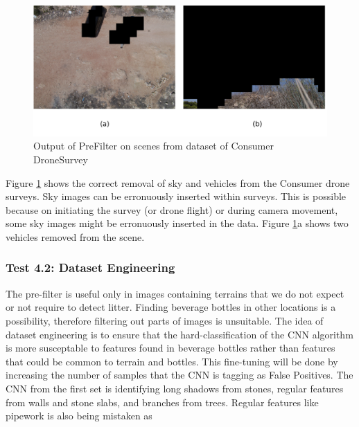 \documentclass{IEEEtran}
\begin{document}
\begin{figure}[H]
\centering
\includegraphics[scale=0.5]{images/filter-test.png}
\caption{Output of PreFilter on scenes from dataset of Consumer DroneSurvey}
\label{fig:prefiltertest}
\end{figure}

Figure \ref{fig:prefiltertest} shows the correct removal of sky and vehicles from the Consumer drone surveys. Sky images can be erronuously inserted within surveys. This is possible because on initiating the survey (or drone flight) or during camera movement, some sky images might be erronuously inserted in the data. Figure \ref{fig:prefiltertest}a shows two vehicles removed from the scene. \newline


\subsubsection{Test 4.2: Dataset Engineering}

The pre-filter is useful only in images containing terrains that we do not expect or not require to detect litter. Finding beverage bottles in other locations is a possibility, therefore filtering out parts of images is unsuitable. The idea of dataset engineering is to ensure that the hard-classification of the CNN algorithm is more susceptable to features found in beverage bottles rather than features that could be common to terrain and bottles. This fine-tuning will be done by increasing the number of samples that the CNN is tagging as False Positives. The CNN from the first set is identifying long shadows from stones, regular features from walls and stone slabs, and branches from trees. Regular features like pipework is also being mistaken as 
\end{document}
